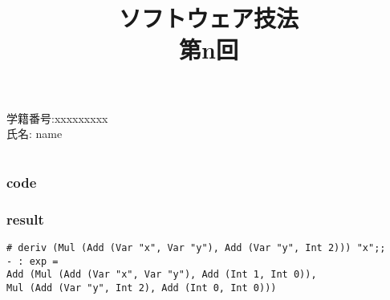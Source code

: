 \documentclass[10pt]{article}
\title{\rm ソフトウェア技法 \\ 第n回}
\author{}
\date{}
\begin{document}
\maketitle

\begin{description}
	\item[\rm \large 学籍番号:xxxxxxxxx]
	\item[\rm \large 氏名: name]
\end{description}

\section{}
\subsection{}
\subsubsection*{code}
% 
\subsubsection*{result}
\begin{lstlisting}
# deriv (Mul (Add (Var "x", Var "y"), Add (Var "y", Int 2))) "x";;
- : exp =
Add (Mul (Add (Var "x", Var "y"), Add (Int 1, Int 0)),
Mul (Add (Var "y", Int 2), Add (Int 0, Int 0)))
\end{lstlisting}
\end{document}
